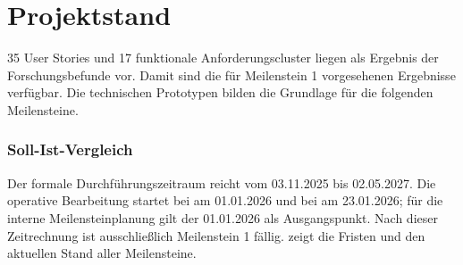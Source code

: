 \documentclass[type=zwischenbericht]{zukunftbau}
\begin{document}
\part{Projektstand}

35 User Stories und 17 funktionale Anforderungscluster liegen als Ergebnis der Forschungsbefunde vor. Damit sind die für Meilenstein 1 vorgesehenen Ergebnisse verfügbar. Die technischen Prototypen bilden die Grundlage für die folgenden Meilensteine.

\section{Soll-Ist-Vergleich}
\label{abschnitt:soll-ist-vergleich}

Der formale Durchführungszeitraum reicht vom 03.11.2025 bis 02.05.2027. Die operative Bearbeitung startet bei  am 01.01.2026 und bei  am 23.01.2026; für die interne Meilensteinplanung gilt der 01.01.2026 als Ausgangspunkt. Nach dieser Zeitrechnung ist ausschließlich Meilenstein 1 fällig.  zeigt die Fristen und den aktuellen Stand aller Meilensteine.
\end{document}
